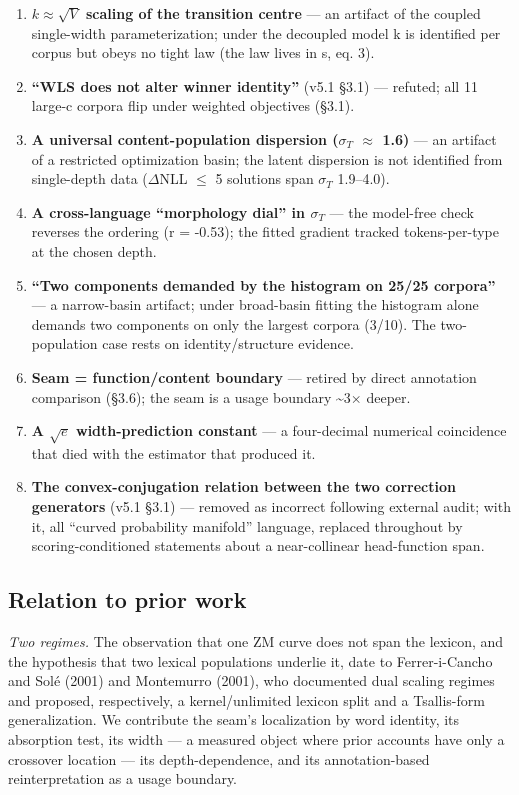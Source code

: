 \documentclass[11pt]{article}
\begin{document}
\begin{enumerate}
\item \textbf{$k \approx \sqrt{V}$ scaling of the transition centre} --- an artifact of the coupled
single-width parameterization; under the decoupled model k is identified per
corpus but obeys no tight law (the law lives in s, eq. 3).
\item \textbf{``WLS does not alter winner identity''} (v5.1 \S3.1) --- refuted; all 11
large-c corpora flip under weighted objectives (\S3.1).
\item \textbf{A universal content-population dispersion ($\sigma_T$ $\approx$ 1.6)} --- an artifact of a
restricted optimization basin; the latent dispersion is not identified from
single-depth data ($\Delta$NLL $\le$ 5 solutions span $\sigma_T$ 1.9--4.0).
\item \textbf{A cross-language ``morphology dial'' in $\sigma_T$} --- the model-free check reverses
the ordering (r = -0.53); the fitted gradient tracked tokens-per-type at the
chosen depth.
\item \textbf{``Two components demanded by the histogram on 25/25 corpora''} --- a
narrow-basin artifact; under broad-basin fitting the histogram alone demands
two components on only the largest corpora (3/10). The two-population case
rests on identity/structure evidence.
\item \textbf{Seam = function/content boundary} --- retired by direct annotation
comparison (\S3.6); the seam is a usage boundary \~{}3$\times$ deeper.
\item \textbf{A $\sqrt{e}$ width-prediction constant} --- a four-decimal numerical coincidence
that died with the estimator that produced it.
\item \textbf{The convex-conjugation relation between the two correction generators}
(v5.1 \S3.1) --- removed as incorrect following external audit; with it, all
``curved probability manifold'' language, replaced throughout by
scoring-conditioned statements about a near-collinear head-function span.
\end{enumerate}
\subsection{Relation to prior work}
\emph{Two regimes.} The observation that one ZM curve does not span the lexicon, and the hypothesis that two lexical populations underlie it, date to Ferrer-i-Cancho and Solé (2001) and Montemurro (2001), who documented dual scaling regimes and proposed, respectively, a kernel/unlimited lexicon split and a Tsallis-form generalization. We contribute the seam's localization by word identity, its absorption test, its width --- a measured object where prior accounts have only a crossover location --- its depth-dependence, and its annotation-based reinterpretation as a usage boundary.
\end{document}
